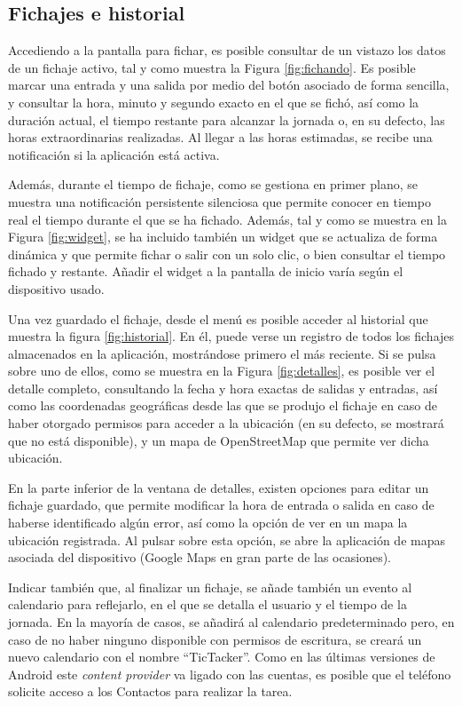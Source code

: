 \subsection{Fichajes e historial}

Accediendo a la pantalla para fichar, es posible consultar de un vistazo los datos de un fichaje activo, tal y como muestra la Figura \ref{fig:fichando}. Es posible marcar una entrada y una salida por medio del botón asociado de forma sencilla, y consultar la hora, minuto y segundo exacto en el que se fichó, así como la duración actual, el tiempo restante para alcanzar la jornada o, en su defecto, las horas extraordinarias realizadas. Al llegar a las horas estimadas, se recibe una notificación si la aplicación está activa.

Además, durante el tiempo de fichaje, como se gestiona en primer plano, se muestra una notificación persistente silenciosa que permite conocer en tiempo real el tiempo durante el que se ha fichado. Además, tal y como se muestra en la Figura \ref{fig:widget}, se ha incluido también un widget que se actualiza de forma dinámica y que permite fichar o salir con un solo clic, o bien consultar el tiempo fichado y restante. Añadir el widget a la pantalla de inicio varía según el dispositivo usado.

Una vez guardado el fichaje, desde el menú es posible acceder al historial que muestra la figura \ref{fig:historial}. En él, puede verse un registro de todos los fichajes almacenados en la aplicación, mostrándose primero el más reciente. Si se pulsa sobre uno de ellos, como se muestra en la Figura \ref{fig:detalles}, es posible ver el detalle completo, consultando la fecha y hora exactas de salidas y entradas, así como las coordenadas geográficas desde las que se produjo el fichaje en caso de haber otorgado permisos para acceder a la ubicación (en su defecto, se mostrará que no está disponible), y un mapa de OpenStreetMap que permite ver dicha ubicación.

En la parte inferior de la ventana de detalles, existen opciones para editar un fichaje guardado, que permite modificar la hora de entrada o salida en caso de haberse identificado algún error, así como la opción de ver en un mapa la ubicación registrada. Al pulsar sobre esta opción, se abre la aplicación de mapas asociada del dispositivo (Google Maps en gran parte de las ocasiones).

Indicar también que, al finalizar un fichaje, se añade también un evento al calendario para reflejarlo, en el que se detalla el usuario y el tiempo de la jornada. En la mayoría de casos, se añadirá al calendario predeterminado pero, en caso de no haber ninguno disponible con permisos de escritura, se creará un nuevo calendario con el nombre “TicTacker”. Como en las últimas versiones de Android este \textit{content provider} va ligado con las cuentas, es posible que el teléfono solicite acceso a los Contactos para realizar la tarea.

